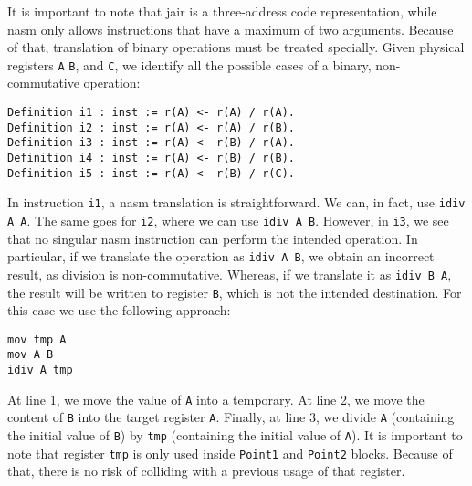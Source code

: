 It is important to note that \gls{jair} is a three-address code representation, while \gls{nasm} only allows instructions that have a maximum of two arguments. Because of that, translation of binary operations must be treated specially.
Given physical registers \texttt A \texttt B, and \texttt C, we identify all the possible cases of a binary, non-commutative operation:
\begin{lstlisting}[style=Rocq]
Definition i1 : inst := r(A) <- r(A) / r(A).
Definition i2 : inst := r(A) <- r(A) / r(B).
Definition i3 : inst := r(A) <- r(B) / r(A).
Definition i4 : inst := r(A) <- r(B) / r(B).
Definition i5 : inst := r(A) <- r(B) / r(C).
\end{lstlisting}


\lstset{style=NASM}
In instruction \texttt{i1}, a \gls{nasm} translation is straightforward. We can, in fact, use \lstinline{idiv A A}. The same goes for \texttt{i2}, where we can use \lstinline{idiv A B}. However, in \texttt{i3}, we see that no singular \gls{nasm} instruction can perform the intended operation. In particular, if we translate the operation as \lstinline{idiv A B}, we obtain an incorrect result, as division is non-commutative. Whereas, if we translate it as \lstinline{idiv B A}, the result will be written to register \texttt B, which is not the intended destination. For this case we use the following approach:

\begin{lstlisting}[style=NASM]
mov tmp A
mov A B
idiv A tmp
\end{lstlisting}

At line 1, we move the value of \texttt A into a temporary. At line 2, we move the content of \texttt B into the target register \texttt A. Finally, at line 3, we divide \texttt A (containing the initial value of \texttt B) by \texttt{tmp} (containing the initial value of \texttt A).
It is important to note that register \texttt{tmp} is only used inside \texttt{Point1} and \texttt{Point2} blocks. Because of that, there is no risk of colliding with a previous usage of that register.

